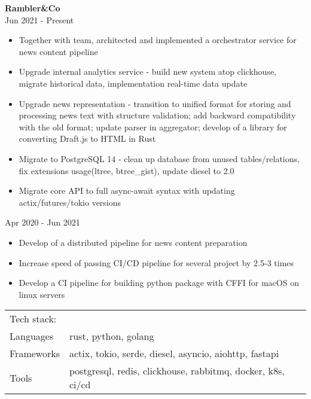 \documentclass[a4paper]{article}
\begin{document}
\textbf{Rambler\&Co} \\
 \hfill Jun 2021 - Present\\
\vspace{-1mm}
\begin{itemize}[leftmargin=16pt,itemsep=0pt,topsep=2pt,label={-}]
    \item Together with team, architected and implemented a orchestrator service for news content pipeline
    \item Upgrade internal analytics service - build new system atop clickhouse, migrate historical data, implementation real-time data update
    \item Upgrade news representation - transition to unified format for storing and processing news text with structure validation; add backward compatibility with the old format; update parser in aggregator; develop of a library for converting Draft.js to HTML in Rust
    \item Migrate to PostgreSQL 14 - clean up database from unused tables/relations, fix extensions usage(ltree, btree\_gist), update diesel to 2.0
    \item Migrate core API to full async-await syntax with updating actix/futures/tokio versions
\end{itemize}
 \hfill Apr 2020 - Jun 2021\\
\begin{itemize}[leftmargin=16pt,itemsep=0pt,topsep=-8pt,label={-}]
    \item Develop of a distributed pipeline for news content preparation
    \item Increase speed of passing CI/CD pipeline for several project by 2.5-3 times
    \item Develop a CI pipeline for building python package with CFFI for macOS on linux servers
\end{itemize}
\begin{table}[h!]
    \begin{tabular}{ l l }
        Tech stack:& \\
        Languages  & rust, python, golang \\
        Frameworks & actix, tokio, serde, diesel, asyncio, aiohttp, fastapi \\
        Tools      & postgresql, redis, clickhouse, rabbitmq, docker, k8s, ci/cd \\
    \end{tabular}
\end{table}
\end{document}
